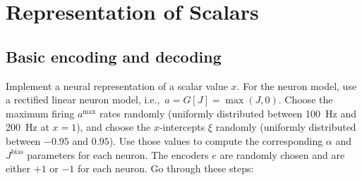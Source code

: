 %
%
%
%



\newcommand{\assignmentCourse}{SYDE 556/750}
\newcommand{\assignmentCourseName}{Simulating Neurobiological Systems}
\newcommand{\assignmentName}{Assignment 1}
\newcommand{\assignmentNo}{01}
\newcommand{\assignmentTerm}{Winter 2020}
\newcommand{\assignmentDue}{January 30, 2020}
\newcommand{\assignmentMarks}{20 marks (20\% of the final grade)}
\newcommand{\assignmentURL}{https://github.com/astoeckel/syde556-w20/blob/master/assignments/assignment_01/syde556_assignment_01_template.ipynb}
\newcommand{\assignmentEmail}{astoecke@uwaterloo.ca}
\newcommand{\assignmentExtraNotes}{\item \textbf{Do not use or refer to any code from Nengo!}}


	\assignmentHeader

	\section{Representation of Scalars}

	\subsection{Basic encoding and decoding}

	Implement a neural representation of a scalar value $x$. For the neuron model, use a rectified linear neuron model, i.e.,~$a=G[J]=\max(J,0)$. Choose the maximum firing $a^\mathrm{max}$ rates randomly (uniformly distributed between \SI{100}{\hertz} and \SI{200}{\hertz} at $x=1$), and choose the $x$-intercepts $\xi$ randomly (uniformly distributed between $-0.95$ and $0.95$). Use those values to compute the corresponding $\alpha$ and $J^\mathrm{bias}$ parameters for each neuron. The encoders $e$ are randomly chosen and are either $+1$ or $-1$ for each neuron. Go through these steps:

